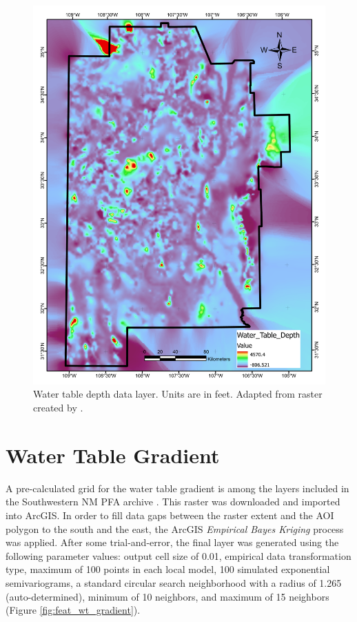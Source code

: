 \begin{figure}[H]
\centering
\includegraphics[width=0.75\linewidth]{templates/images/Figure-WTDepth.pdf}
\caption[Water table depth data layer]{Water table depth data layer. Units are in feet. Adapted from raster created by \protect\citep{bielicki_hydrogeolgic_2015}.}
\label{fig:feat_wtdepth}
\end{figure}
\pagebreak

\section{Water Table Gradient}\label{app:dl_wt_gradient}
A pre-calculated grid for the water table gradient is among the layers included in the Southwestern NM PFA archive \citep{kelley_geothermal_2015}. This raster was downloaded and imported into ArcGIS. In order to fill data gaps between the raster extent and the AOI polygon to the south and the east, the ArcGIS \textit{Empirical Bayes Kriging} process was applied. After some trial-and-error, the final layer was generated using the following parameter values: output cell size of 0.01, empirical data transformation type, maximum of 100 points in each local model, 100 simulated exponential semivariograms, a standard circular search neighborhood with a radius of 1.265 (auto-determined), minimum of 10 neighbors, and maximum of 15 neighbors (Figure \ref{fig:feat_wt_gradient}).
\vfill
\pagebreak

